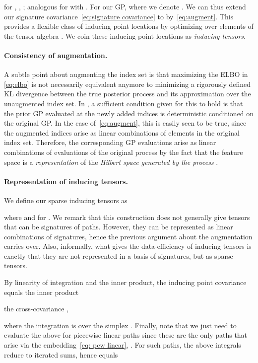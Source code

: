 \documentclass{article}
\begin{document}
   for , , ; analogous for  with . 
For our GP,  where we denote . 
We can thus extend our signature covariance~\eqref{eq:signature covariance} to  by~\eqref{eq:augment}. 
This provides a flexible class of inducing point locations  by optimizing over elements of the tensor algebra .
We coin these inducing point locations as \textit{inducing tensors}.
	
	\paragraph{Consistency of augmentation.}	
	A subtle point about augmenting the index set is that maximizing the ELBO in \eqref{eq:elbo} is not necessarily equivalent anymore to minimizing a rigorously defined KL divergence between the true posterior process and its approximation over the unaugmented index set. In \cite{matthews2016sparse}, a sufficient condition given for this to hold is that the prior GP evaluated at the newly added indices is deterministic conditioned on the original GP.
  In the case of~\eqref{eq:augment}, this is easily seen to be true, since the augmented indices arise as linear combinations of elements in the original index set. 
Therefore, the corresponding GP evaluations arise as linear combinations of evaluations of the original process by the fact that the feature space  is a \textit{representation} of the \textit{Hilbert space generated by the process} \cite{berlinet2003reproducing}.
	
	\paragraph{Representation of inducing tensors.}
We define our sparse inducing tensors as 
	
  where  and  for .
  We remark that this construction does not generally give tensors that can be signatures of paths.
  However, they can be represented as linear combinations of signatures, hence the previous argument about the augmentation carries over. Also, informally, what gives the data-efficiency of inducing tensors is exactly that they are not represented in a basis of signatures, but as sparse tensors.


By linearity of integration and the inner product, the inducing point covariance  equals the inner product 
	
the cross-covariance ,
	
where the integration is over the simplex .
  Finally, note that we just need to evaluate the above for piecewise linear paths since these are the only paths that arise via the embedding~\eqref{eq: pcw linear}, .
  For such paths, the above integrals reduce to iterated sums, hence  equals
	
\end{document}

